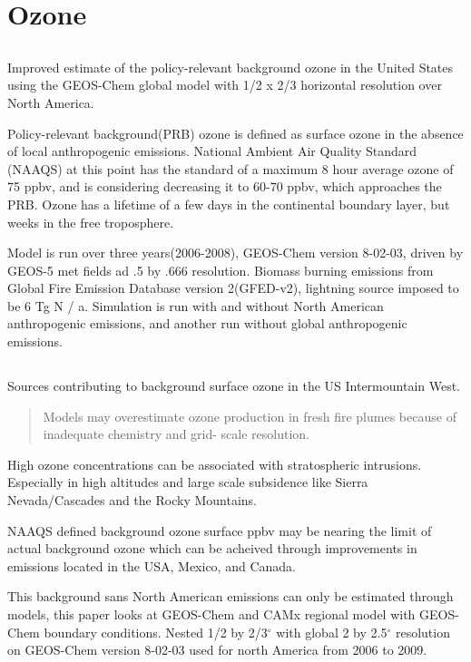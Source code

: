 \section{Ozone}

\subsection{\cite{Zhang_2011}}
Improved estimate of the policy-relevant background ozone in the United States using the GEOS-Chem global model with 1/2 x 2/3 horizontal resolution over North America.

Policy-relevant background(PRB) ozone is defined as surface ozone in the absence of local anthropogenic emissions.
National Ambient Air Quality Standard (NAAQS) at this point has the standard of a maximum  8 hour average ozone of 75 ppbv, and is considering decreasing it to 60-70 ppbv, which approaches the PRB. Ozone has a lifetime of a few days in the continental boundary layer, but weeks in the free troposphere.

Model is run over three years(2006-2008), GEOS-Chem version 8-02-03, driven by GEOS-5 met fields ad .5 by .666 resolution. Biomass burning emissions from Global Fire Emission Database version 2(GFED-v2), lightning source imposed to be 6 Tg N / a.
Simulation is run with and without North American anthropogenic emissions, and another run without global anthropogenic emissions.

\subsection{\cite{Zhang_2014}}
Sources contributing to background surface ozone in the US
Intermountain West.

\begin{quote}
Models may overestimate ozone production in
fresh fire plumes because of inadequate chemistry and grid-
scale resolution.
\end{quote}

High ozone concentrations can be associated with stratospheric intrusions.
Especially in high altitudes and large scale subsidence like Sierra Nevada/Cascades and the Rocky Mountains.

NAAQS defined background ozone surface ppbv may be nearing the limit of actual background ozone which can be acheived through improvements in emissions located in the USA, Mexico, and Canada.

This background sans North American emissions can only be estimated through models, this paper looks at GEOS-Chem and CAMx regional model with GEOS-Chem boundary conditions.
Nested 1/2 by 2/3$^{\circ}$ with global 2 by 2.5$^{\circ}$ resolution on GEOS-Chem version 8-02-03 used for north America from 2006 to 2009.


